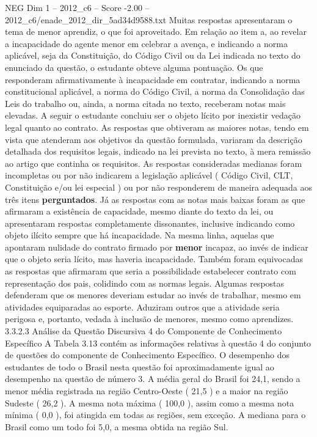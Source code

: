 \begin{textsample}{NEG Dim 1 – 2012\_c6 – Score -2.00 – 2012\_c6/enade\_2012\_dir\_5ad34d9588.txt}
Muitas respostas apresentaram o tema de menor aprendiz, o que foi aproveitado.
Em relação ao item a, ao revelar a incapacidade do agente menor em celebrar a avença, e indicando a norma aplicável, seja da Constituição, do Código Civil ou da Lei indicada no texto do enunciado da questão, o estudante obteve alguma pontuação.
Os que responderam afirmativamente à incapacidade em contratar, indicando a norma constitucional aplicável, a norma do Código Civil, a norma da Consolidação das Leis do trabalho ou, ainda, a norma citada no texto, receberam notas mais elevadas.
A seguir o estudante concluiu ser o objeto lícito por inexistir vedação legal quanto ao contrato.
As respostas que obtiveram as maiores notas, tendo em vista que atenderam aos objetivos da questão formulada, variaram da descrição detalhada dos requisitos legais, indicado na lei prevista no texto, à mera remissão ao artigo que continha os requisitos.
As respostas consideradas medianas foram incompletas ou por não indicarem a legislação aplicável ( Código Civil, CLT, Constituição e/ou lei especial ) ou por não responderem de maneira adequada aos três itens \textbf{perguntados}.
Já as respostas com as notas mais baixas foram as que afirmaram a existência de capacidade, mesmo diante do texto da lei, ou apresentaram respostas completamente dissonantes, inclusive indicando como objeto ilícito sempre que há incapacidade.
Na mesma linha, aquelas que apontaram nulidade do contrato firmado por \textbf{menor} incapaz, ao invés de indicar que o objeto seria lícito, mas haveria incapacidade.
Também foram equivocadas as respostas que afirmaram que seria a possibilidade estabelecer contrato com representação dos pais, colidindo com as normas legais.
Algumas respostas defenderam que os menores deveriam estudar ao invés de trabalhar, mesmo em atividades equiparadas ao esporte.
Aduziram outros que a atividade seria perigosa e, portanto, vedada à inclusão de menores, mesmo como aprendizes. 3.3.2.3 Análise da Questão Discursiva 4 do Componente de Conhecimento Específico A Tabela 3.13 contém as informações relativas à questão 4 do conjunto de questões do componente de Conhecimento Específico.
O desempenho dos estudantes de todo o Brasil nesta questão foi aproximadamente igual ao desempenho na questão de número 3.
A média geral do Brasil foi 24,1, sendo a menor média registrada na região Centro-Oeste ( 21,5 ) e a maior na região Sudeste ( 26,2 ).
A mesma nota máxima ( 100,0 ), assim como a mesma nota mínima ( 0,0 ), foi atingida em todas as regiões, sem exceção.
A mediana para o Brasil como um todo foi 5,0, a mesma obtida na região Sul.

\end{textsample}
